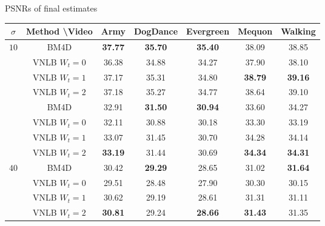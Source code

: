 \documentclass[mathserif]{beamer}
\makeatletter
\newcounter{multipleslide}
\newcommand{\restoreframe}{%
\patchcmd{\beamer@@tmpl@footline}%
	{\themultipleslide}%
	{\insertframenumber}%
	{}%
	{}%
\setcounter{framenumber}{\value{multipleslide}}%
}
\makeatother
\begin{document}
\begin{frame}{PSNRs of final estimates}

	{\small
	\begin{tabular}{| c | c |c c c c c|}
		\hline \hline
		$\sigma$  & Method \textbackslash Video & Army & DogDance & Evergreen & Mequon & Walking \\\hline\hline
		\multirow{5}{*}{$10$} & BM4D           & \textbf{37.77} & \textbf{35.70} & \textbf{35.40} &         38.09  &         38.85  \\%
		                      & VNLB $W_t = 0$ &         36.38  &         34.88  &         34.27  &         37.90  &         38.10  \\%
		                      & VNLB $W_t = 1$ &         37.17  &         35.31  &         34.80  & \textbf{38.79} & \textbf{39.16} \\%
		                      & VNLB $W_t = 2$ &         37.18  &         35.27  &         34.77  &         38.64  &         39.10  \\\hline
%									 
		\multirow{5}{*}{$25$} & BM4D           &         32.91  & \textbf{31.50} & \textbf{30.94} &         33.60  &         34.27  \\%
		                      & VNLB $W_t = 0$ &         32.11  &         30.88  &         30.18  &         33.30  &         33.19  \\%
		                      & VNLB $W_t = 1$ &         33.07  &         31.45  &         30.70  &         34.28  &         34.14  \\%
		                      & VNLB $W_t = 2$ & \textbf{33.19} &         31.44  &         30.69  & \textbf{34.34} & \textbf{34.31} \\\hline
%									 
		\multirow{5}{*}{$40$} & BM4D           &         30.42  & \textbf{29.29} &         28.65  &         31.02  & \textbf{31.64} \\%
		                      & VNLB $W_t = 0$ &         29.51  &         28.48  &         27.90  &         30.30  &         30.15  \\%
		                      & VNLB $W_t = 1$ &         30.62  &         29.19  &         28.61  &         31.31  &         31.11  \\%
									 & VNLB $W_t = 2$ & \textbf{30.81} &         29.24  & \textbf{28.66} & \textbf{31.43} &         31.35  \\\hline\hline
	\end{tabular}}

\end{frame}
\restoreframe
\end{document}

